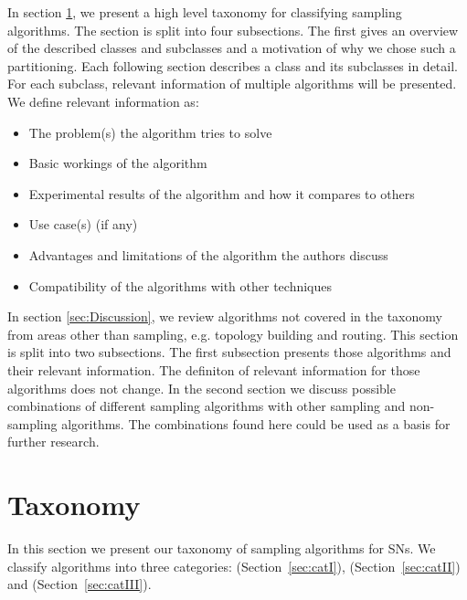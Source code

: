  In section \ref{sec:Taxonomy}, we present a
high level taxonomy for classifying sampling algorithms. The section is split
into four subsections. The first gives an overview of the described classes and
subclasses and a motivation of why we chose such a partitioning. Each following
section describes a class and its subclasses in detail. For each subclass,
relevant information of multiple algorithms will be presented. We define
relevant information as:
\begin{itemize}
	\item The problem(s) the algorithm tries to solve
	\item Basic workings of the algorithm
	\item Experimental results of the algorithm and how it compares to others
	\item Use case(s) (if any)
	\item Advantages and limitations of the algorithm the authors discuss
	\item Compatibility of the algorithms with other techniques
\end{itemize}   


 In section \ref{sec:Discussion}, we review
algorithms not covered in the taxonomy from areas other than sampling, e.g.
topology building and routing. This section is split into two subsections. The
first subsection presents those algorithms and their relevant information. The
definiton of relevant information for those algorithms does not change. In the
second section we discuss possible combinations of different sampling
algorithms with other sampling and non-sampling algorithms. The combinations
found here could be used as a basis for further research.


\section{Taxonomy}
\label{sec:Taxonomy}

In this section we present our taxonomy of sampling algorithms for \acp{SN}. We
classify algorithms into three categories: \catI (Section~\ref{sec:catI}), \catII (Section~\ref{sec:catII})  and \catIII (Section~\ref{sec:catIII}).



